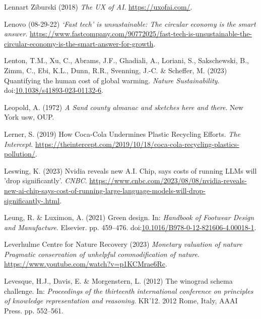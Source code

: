 \documentclass[
  letterpaper,
  DIV=11,
  numbers=noendperiod]{scrartcl}
\newlength{\cslhangindent}
\newenvironment{CSLReferences}[2] %
 {\begin{list}{}{%
  \setlength{\itemindent}{0pt}
  \setlength{\leftmargin}{0pt}
  \setlength{\parsep}{0pt}
  \ifodd #1
   \setlength{\leftmargin}{\cslhangindent}
   \setlength{\itemindent}{-1\cslhangindent}
  \fi
  \setlength{\itemsep}{#2\baselineskip}}}
 {\end{list}}
\begin{document}
\begin{CSLReferences}{0}{1}
Lennart Ziburski (2018) \emph{The {UX} of {AI}}.
\url{https://uxofai.com/}.

Lenovo (08-29-22) \emph{{`{Fast} tech'} is unsustainable: {The} circular
economy is the smart answer}.
\url{https://www.fastcompany.com/90772025/fast-tech-is-unsustainable-the-circular-economy-is-the-smart-answer-for-growth}.

Lenton, T.M., Xu, C., Abrams, J.F., Ghadiali, A., Loriani, S.,
Sakschewski, B., Zimm, C., Ebi, K.L., Dunn, R.R., Svenning, J.-C. \&
Scheffer, M. (2023) Quantifying the human cost of global warming.
\emph{Nature Sustainability}.
doi:\href{https://doi.org/10.1038/s41893-023-01132-6}{10.1038/s41893-023-01132-6}.

Leopold, A. (1972) \emph{A {Sand} county almanac and sketches here and
there}. New York usw, OUP.

Lerner, S. (2019) How {Coca-Cola Undermines Plastic Recycling Efforts}.
\emph{The Intercept}.
\url{https://theintercept.com/2019/10/18/coca-cola-recycling-plastics-pollution/}.

Leswing, K. (2023) Nvidia reveals new {A}.{I}. Chip, says costs of
running {LLMs} will 'drop significantly'. \emph{CNBC}.
\url{https://www.cnbc.com/2023/08/08/nvidia-reveals-new-ai-chip-says-cost-of-running-large-language-models-will-drop-significantly-.html}.

Leung, R. \& Luximon, A. (2021) Green design. In: \emph{Handbook of
{Footwear Design} and {Manufacture}}. Elsevier. pp. 459--476.
doi:\href{https://doi.org/10.1016/B978-0-12-821606-4.00018-1}{10.1016/B978-0-12-821606-4.00018-1}.

Leverhulme Centre for Nature Recovery (2023) \emph{Monetary valuation of
nature {Pragmatic} conservation of unhelpful commodification of nature}.
\url{https://www.youtube.com/watch?v=p1KCMrae6Rc}.

Levesque, H.J., Davis, E. \& Morgenstern, L. (2012) The winograd schema
challenge. In: \emph{Proceedings of the thirteenth international
conference on principles of knowledge representation and reasoning}.
{KR}'12. 2012 Rome, Italy, AAAI Press. pp. 552--561.


\end{CSLReferences}
\end{document}
